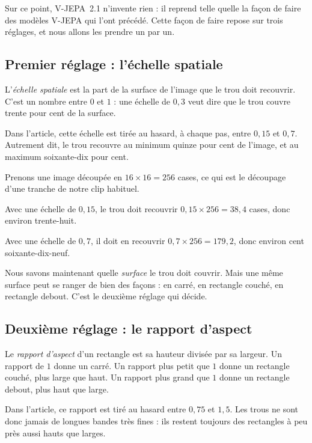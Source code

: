 Sur ce point, V-JEPA~2.1 n'invente rien : il reprend telle quelle la façon
de faire des modèles V-JEPA qui l'ont précédé. Cette façon de faire repose
sur trois réglages, et nous allons les prendre un par un.

\subsection*{Premier réglage : l'échelle spatiale}

\begin{definition}
L'\emph{échelle spatiale} est la part de la surface de l'image que le trou
doit recouvrir. C'est un nombre entre $0$ et $1$ : une échelle de $0{,}3$
veut dire que le trou couvre trente pour cent de la surface.

Dans l'article, cette échelle est tirée au hasard, à chaque pas, entre
$0{,}15$ et $0{,}7$. Autrement dit, le trou recouvre au minimum quinze pour
cent de l'image, et au maximum soixante-dix pour cent.
\end{definition}

\begin{exemple}
Prenons une image découpée en $16 \times 16 = 256$ cases, ce qui est le
découpage d'une tranche de notre clip habituel.

Avec une échelle de $0{,}15$, le trou doit recouvrir
$0{,}15 \times 256 = 38{,}4$ cases, donc environ trente-huit.

Avec une échelle de $0{,}7$, il doit en recouvrir
$0{,}7 \times 256 = 179{,}2$, donc environ cent soixante-dix-neuf.
\end{exemple}

Nous savons maintenant quelle \emph{surface} le trou doit couvrir. Mais une
même surface peut se ranger de bien des façons : en carré, en rectangle
couché, en rectangle debout. C'est le deuxième réglage qui décide.

\subsection*{Deuxième réglage : le rapport d'aspect}

\begin{definition}
Le \emph{rapport d'aspect} d'un rectangle est sa hauteur divisée par sa
largeur. Un rapport de $1$ donne un carré. Un rapport plus petit que $1$
donne un rectangle couché, plus large que haut. Un rapport plus grand que
$1$ donne un rectangle debout, plus haut que large.

Dans l'article, ce rapport est tiré au hasard entre $0{,}75$ et $1{,}5$. Les
trous ne sont donc jamais de longues bandes très fines : ils restent
toujours des rectangles à peu près aussi hauts que larges.
\end{definition}

